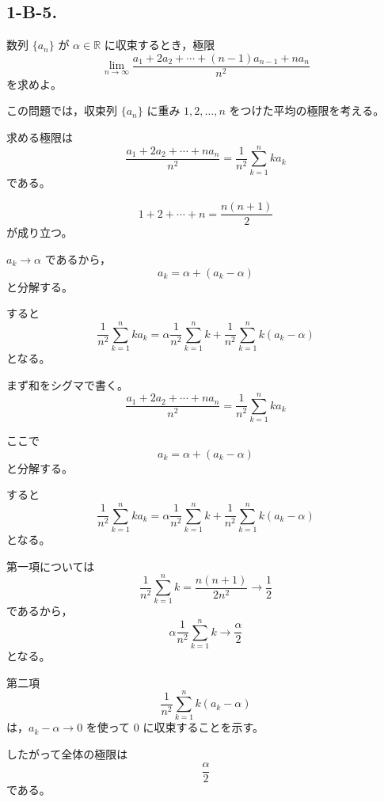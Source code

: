 \subsection{1-B-5.}
\begin{exercise}
	数列 $\{a_n\}$ が $\alpha\in\mathbb{R}$ に収束するとき，極限
	\[
		\lim_{n\to\infty}
		\frac{a_1+2a_2+\cdots+(n-1)a_{n-1}+na_n}{n^2}
	\]
	を求めよ。
\end{exercise}
\begin{background}
	この問題では，収束列 $\{a_n\}$ に重み $1,2,\ldots,n$ をつけた平均の極限を考える。

	\begin{remark}
		求める極限は
		\[
			\frac{a_1+2a_2+\cdots+na_n}{n^2}
			=
			\frac{1}{n^2}\sum_{k=1}^{n}ka_k
		\]
		である。
	\end{remark}

	\begin{lemma}[自然数の和]
		\[
			1+2+\cdots+n
			=
			\frac{n(n+1)}{2}
		\]
		が成り立つ。
	\end{lemma}

	\begin{remark}
		$a_k\to\alpha$ であるから，
		\[
			a_k=\alpha+(a_k-\alpha)
		\]
		と分解する。

		すると
		\[
			\frac{1}{n^2}\sum_{k=1}^{n}ka_k
			=
			\alpha\frac{1}{n^2}\sum_{k=1}^{n}k
			+
			\frac{1}{n^2}\sum_{k=1}^{n}k(a_k-\alpha)
		\]
		となる。
	\end{remark}
\end{background}
\begin{strategy}
	まず和をシグマで書く。
	\[
		\frac{a_1+2a_2+\cdots+na_n}{n^2}
		=
		\frac{1}{n^2}\sum_{k=1}^{n}ka_k
	\]

	ここで
	\[
		a_k=\alpha+(a_k-\alpha)
	\]
	と分解する。

	すると
	\[
		\frac{1}{n^2}\sum_{k=1}^{n}ka_k
		=
		\alpha\frac{1}{n^2}\sum_{k=1}^{n}k
		+
		\frac{1}{n^2}\sum_{k=1}^{n}k(a_k-\alpha)
	\]
	となる。

	第一項については
	\[
		\frac{1}{n^2}\sum_{k=1}^{n}k
		=
		\frac{n(n+1)}{2n^2}
		\to
		\frac{1}{2}
	\]
	であるから，
	\[
		\alpha\frac{1}{n^2}\sum_{k=1}^{n}k
		\to
		\frac{\alpha}{2}
	\]
	となる。

	第二項
	\[
		\frac{1}{n^2}\sum_{k=1}^{n}k(a_k-\alpha)
	\]
	は，$a_k-\alpha\to 0$ を使って $0$ に収束することを示す。

	したがって全体の極限は
	\[
		\frac{\alpha}{2}
	\]
	である。
\end{strategy}